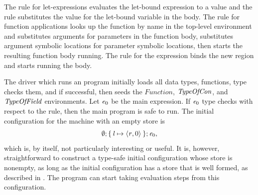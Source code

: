 \documentclass[showabstract,showacknowledgments,showpreface,showdedication]{iuphd}
\theoremstyle{nonumberplain}
\begin{document}
The \textsc{\dletexp{}} rule for let-expressions evaluates the let-bound
expression to a value and the \textsc{\dletval{}} rule substitutes the value for
the let-bound variable in the body.
%
The \textsc{\dapp{}} rule for function applications looks up the function by name
in the top-level environment and substitutes arguments for parameters
in the function body, substitutes argument symbolic locations for
parameter symbolic locations, then starts the resulting function body
running.
%
The \textsc{\dletregion{}} rule for the  expression binds the
new region and starts running the body.
%

The driver which runs an \ourcalc{} program initially loads all data
types, functions, type checks them, and if successful, then seeds the
$Function$, $\mathit{TypeOfCon}$, and $\mathit{TypeOfField}$ environments.
%
Let $\mathit{e}_0$ be the main expression.
%
If $\mathit{e}_0$ type checks with respect to the \textsc{\tprogram{}} rule, then
the main program is safe to run.
%
The initial configuration for the machine with an empty store is
\begin{displaymath}
\emptyset; \{ \, \mathit{l} \mapsto \langle \mathit{r}, 0 \rangle ^{} \,\}; \mathit{e}_0,
\end{displaymath}
which is, by itself, not particularly interesting or useful.
%
It is, however, straightforward to construct a type-safe initial configuration
whose store is nonempty, as long as the initial configuration
has a store that is well formed, as described in .
%
The program can start taking evaluation steps from this configuration.
\end{document}
